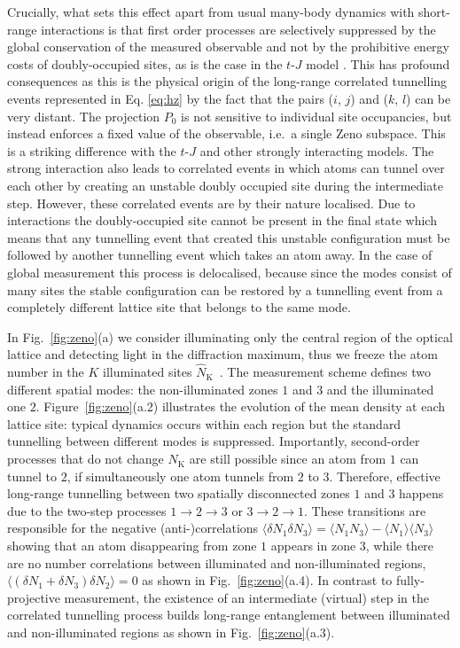 Crucially, what sets this effect apart from usual many-body dynamics
with short-range interactions is that first order processes are
selectively suppressed by the global conservation of the measured
observable and not by the prohibitive energy costs of doubly-occupied
sites, as is the case in the $t$-$J$ model \cite{auerbach}. This has
profound consequences as this is the physical origin of the long-range
correlated tunnelling events represented in Eq. \eqref{eq:hz} by the
fact that the pairs ($i$, $j$) and ($k$, $l$) can be very distant. The
projection $P_0$ is not sensitive to individual site
occupancies, but instead enforces a fixed value of the observable,
i.e.~a single Zeno subspace. This is a striking difference with the
$t$-$J$ and other strongly interacting models. The strong interaction
also leads to correlated events in which atoms can tunnel over each
other by creating an unstable doubly occupied site during the
intermediate step. However, these correlated events are by their
nature localised. Due to interactions the doubly-occupied site cannot
be present in the final state which means that any tunnelling event
that created this unstable configuration must be followed by another
tunnelling event which takes an atom away. In the case of global
measurement this process is delocalised, because since the modes
consist of many sites the stable configuration can be restored by a
tunnelling event from a completely different lattice site that belongs
to the same mode.

In Fig.~\ref{fig:zeno}(a) we consider illuminating only the central
region of the optical lattice and detecting light in the diffraction
maximum, thus we freeze the atom number in the $K$ illuminated sites
$\hat{N}_\text{K}$~\cite{mekhov2009prl,mekhov2009pra}. The measurement
scheme defines two different spatial modes: the non-illuminated zones
$1$ and $3$ and the illuminated one $2$. Figure~\ref{fig:zeno}(a.2)
illustrates the evolution of the mean density at each lattice site:
typical dynamics occurs within each region but the standard tunnelling
between different modes is suppressed. Importantly, second-order
processes that do not change $N_\text{K}$ are still possible since an
atom from $1$ can tunnel to $2$, if simultaneously one atom tunnels
from $2$ to $3$. Therefore, effective long-range tunnelling between two
spatially disconnected zones $1$ and $3$ happens due to the two-step
processes $1 \rightarrow 2 \rightarrow 3$ or
$3 \rightarrow 2 \rightarrow 1$. These transitions are responsible for
the negative (anti-)correlations
$\langle \delta N_1 \delta N_3 \rangle = \langle N_1 N_3 \rangle -
\langle N_1 \rangle \langle N_3 \rangle$ showing that an atom
disappearing from zone $1$ appears in zone $3$, while there are no
number correlations between illuminated and non-illuminated regions,
$\langle( \delta N_1 + \delta N_3 ) \delta N_2 \rangle = 0$ as shown
in Fig.~\ref{fig:zeno}(a.4). In contrast to fully-projective
measurement, the existence of an intermediate (virtual) step in the
correlated tunnelling process builds long-range entanglement between
illuminated and non-illuminated regions as shown in
Fig.~\ref{fig:zeno}(a.3).


